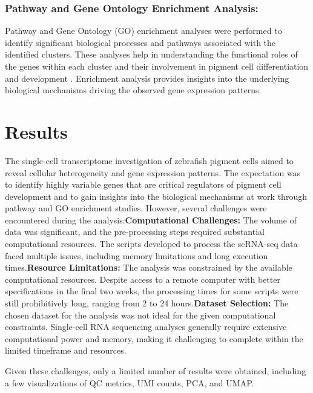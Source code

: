 \documentclass[runningheads]{llncs}
\begin{document}
\subsubsection{Pathway and Gene Ontology Enrichment Analysis:} Pathway and Gene Ontology (GO) enrichment analyses were performed to identify significant biological processes and pathways associated with the identified clusters. These analyses help in understanding the functional roles of the genes within each cluster and their involvement in pigment cell differentiation and development \cite{kenny2022tfap2}. Enrichment analysis provides insights into the underlying biological mechanisms driving the observed gene expression patterns.

\section{Results}

The single-cell transcriptome investigation of zebrafish pigment cells aimed to reveal cellular heterogeneity and gene expression patterns. The expectation was to identify highly variable genes that are critical regulators of pigment cell development and to gain insights into the biological mechanisms at work through pathway and GO enrichment studies. However, several challenges were encountered during the analysis:\newline\textbf{Computational Challenges:} The volume of data was significant, and the pre-processing steps required substantial computational resources. The scripts developed to process the scRNA-seq data faced multiple issues, including memory limitations and long execution times.\newline\textbf{Resource Limitations:} The analysis was constrained by the available computational resources. Despite access to a remote computer with better specifications in the final two weeks, the processing times for some scripts were still prohibitively long, ranging from 2 to 24 hours.\newline\textbf{Dataset Selection:} The chosen dataset for the analysis was not ideal for the given computational constraints. Single-cell RNA sequencing analyses generally require extensive computational power and memory, making it challenging to complete within the limited timeframe and resources.

Given these challenges, only a limited number of results were obtained, including a few visualizations of QC metrics, UMI counts, PCA, and UMAP.
\end{document}
